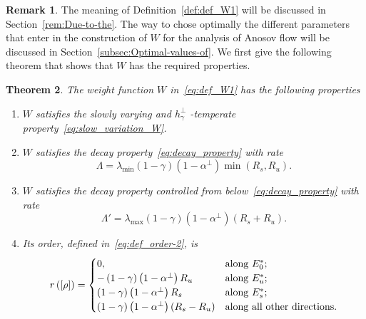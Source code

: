 \documentclass[10pt]{amsart}
\newtheorem{theo}{Theorem}[section]
\theoremstyle{definition}\newtheorem{defi}[theo]{Definition}\newtheorem{rema}[theo]{Remark}\newtheorem{exam}[theo]{Example}\newtheorem{exem}[theo]{Example}\newtheorem{nota}[theo]{Notation}
\begin{document}
\begin{rema}
The meaning of Definition~\ref{def:def_W1} will be discussed in Section~\ref{rem:Due-to-the}. The way to chose optimally the different parameters that enter in the construction of $W$ for the analysis of Anosov flow will be discussed in Section~\ref{subsec:Optimal-values-of}. We first give the following theorem that shows that $W$ has the required properties.
\end{rema}

\begin{cBoxB}{}
\begin{theo}\label{thm:W}
The weight function $W$ in~\eqref{eq:def_W1} has the following properties
\begin{enumerate}
\item \label{enu:-satisfies--temperate-1}
$W$ satisfies the slowly varying and $h_{\gamma}^{\perp}$ -temperate property~\eqref{eq:slow_variation_W}.
\item \label{enu:-satisfies-decay-1}
$W$ satisfies the decay property~\eqref{eq:decay_property} with rate
\begin{equation}\label{eq:def_Lambda}
\Lambda=\lambda_{\min}\left(1-\gamma\right)\left(1-\alpha^{\perp}\right)\min\left(R_{s},R_{u}\right).
\end{equation}
\item \label{enu:-satisfies-decay-below}
$W$ satisfies the decay property controlled from below~\eqref{eq:decay_property} with rate
\begin{equation}\label{eq:lAMBDA_P}
\Lambda'=\lambda_{\max}\left(1-\gamma\right)\left(1-\alpha^{\perp}\right)\left(R_{s}+R_{u}\right).
\end{equation}
\item \label{enu:Its-order-is-1}
Its order, defined in~\eqref{eq:def_order-2}, is
\begin{equation}\label{eq:order_of_W1}
r\left(\left[\rho\right]\right)=
\begin{cases}
0, & \text{along \ensuremath{E_{0}^{*}}; }\\
-\left(1-\gamma\right)\left(1-\alpha^{\perp}\right)R_{u} & \text{along \ensuremath{E_{u}^{*}};}\\
\left(1-\gamma\right)\left(1-\alpha^{\perp}\right)R_{s} & \text{along \ensuremath{E_{s}^{*}};}\\
\left(1-\gamma\right)\left(1-\alpha^{\perp}\right)\left(R_{s}-R_{u}\right) & \text{along all other directions.}
\end{cases}
\end{equation}
\end{enumerate}
\end{theo}
\end{cBoxB}
\end{document}
